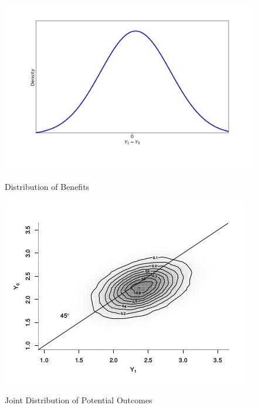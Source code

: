\begin{frame}

\begin{figure}[htp]\centering
	\caption{Distribution of Benefits}\label{Treatment Effects Benefits}\scalebox{0.35}
	{\includegraphics{./material/fig-treatment-effects-benefits.png}}
\end{figure}

\end{frame}


\begin{frame}

\begin{figure}[htp]\centering
	\caption{Joint Distribution of Potential Outcomes}\label{Treatment Effects Benefits}\scalebox{0.80}
	{\includegraphics{./material/fig-distribution-potential_wolabel.png}}
\end{figure}

\end{frame}


